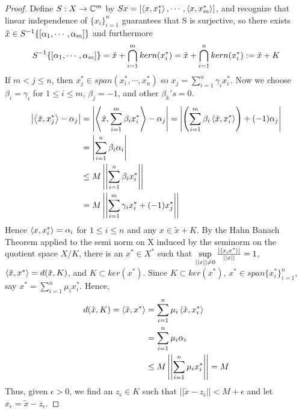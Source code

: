 \begin{thm}
\begin{proof}
        Define $S:X \to \mathbb{C}^{m}$ by $Sx=\left[ \left\langle x,x_1^* \right\rangle,\cdots,\left\langle x,x_m^* \right\rangle \right]$, and recognize that linear independence of $\{x_i\}_{i=1}^n$ guarantees that S is surjective, so there exists 
        $\tilde{x} \in S^{-1} \{ \left[ \alpha_1,\cdots,\alpha_m \right]\}$ and furthermore
        \begin{equation}
            S^{-1}\{ \left[ \alpha_1,\cdots,\alpha_m \right]\}=\tilde{x}+ \bigcap_{i=1}^m kern(x_i^*) = \tilde{x}+ \bigcap_{i=1}^n kern(x_i^*):=\tilde{x}+K 
        \end{equation}
        If $m < j \leq n$, then $x_j^* \in span(x_i^*,\cdots,x_n^*)$ so  $x_j = \sum_{i=1}^n \gamma_i x_i^*$.
        Now we choose $\beta_i=\gamma_i$ for $1 \leq i \leq m$, $\beta_j=-1$, and other $\beta_k's=0$. 
        \begin{align} 
            \left| \left\langle \tilde{x},x_j^* \right\rangle-\alpha_j \right|&= \left| \left\langle \tilde{x},\sum_{i=1}^m \beta_i x_i^* \right\rangle-\alpha_j \right| = \left|  \left( \sum_{i=1}^m \beta_i \left\langle \tilde{x},x_i^* \right\rangle\right)+(-1)\alpha_j \right|\\
            &=\left| \sum_{i=1}^n \beta_i \alpha_i \right| \\
            &\leq M \left|\left| \sum_{i=1}^n \beta_i x_i^* \right|\right| \\
            & =M\left|\left| \sum_{i=1}^m \gamma_i x_i^* + (-1) x_j^* \right|\right|
        \end{align}
        Hence $\left\langle x,x_i^* \right\rangle = \alpha_i$ for $1 \leq i \leq n$ and any $x \in \tilde{x}+K$. 
        By the Hahn Banach Theorem applied to the semi norm on X induced by the seminorm on the quotient space $X/K$, there is an $x^* \in X^*$ such that $\sup\limits_{\left|\left| x \right|\right| \neq 0} \frac{\left| \left\langle x,x^* \right\rangle \right|}{\left|\left| x \right|\right|} =1$, $\left\langle \tilde{x},x^* \right\rangle = d(\tilde{x},K)$, and $K \subset ker(x^*)$. Since $K \subset ker(x^*)$, $x^* \in span \{ x_i^*\}_{i=1}^n$, say $x^* = \sum_{i=1}^n \mu_i x_i^*$. 
        Hence, 
        \begin{equation}
            \begin{split}
                d(\tilde{x},K) = \left\langle \tilde{x},x^* \right\rangle & = \sum_{i=1}^n \mu_i \left\langle \tilde{x},x_i^* \right\rangle\\
                & = \sum_{i=1}^n \mu_i \alpha_i\\
                & \leq M\left|\left| \sum_{i=1}^n \mu_i x_i^* \right|\right|=M 
            \end{split}
        \end{equation}
        Thus, given $\epsilon > 0$, we find an $z_\epsilon \in K$ such that $||\tilde{x}-z_\epsilon|| < M+\epsilon$ and let $x_\epsilon=\tilde{x}-z_\epsilon$. 
        
    \end{proof}
    
\end{thm}

